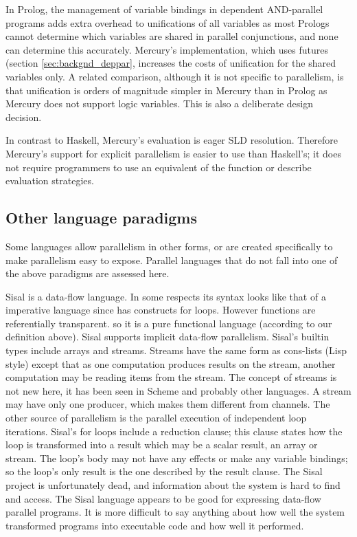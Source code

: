 In Prolog, the management of variable bindings in dependent AND-parallel
programs adds extra overhead to unifications of all variables
as most Prologs cannot determine which variables are shared in parallel
conjunctions,
and none can determine this accurately.
Mercury's implementation,
which uses futures (section \ref{sec:backgnd_deppar},
increases the costs of unification for the shared variables only.
A related comparison, although it is not specific to parallelism,
is that unification is orders of magnitude simpler in Mercury than in
Prolog as Mercury does not support logic variables.
This is also a deliberate design decision.

In contrast to Haskell,
Mercury's evaluation is eager SLD resolution.
Therefore Mercury's support for explicit parallelism is easier to use
than Haskell's;
it does not require programmers to use an equivalent of
the  function or describe evaluation strategies.



\subsection{Other language paradigms}
\label{sec:intro_par_other}

Some languages allow parallelism in other forms,
or are created specifically to make parallelism easy to expose.
Parallel languages that do not fall into one of the above paradigms are
assessed here.

Sisal \citep{feo:1990:sisal-report} is a data-flow language.
In some respects its syntax looks like that of a imperative language
since has constructs for loops.
However functions are referentially transparent.
so it is a pure functional language (according to our definition above).
Sisal supports implicit data-flow parallelism.
Sisal's builtin types include arrays and streams.
Streams have the same form as cons-lists (Lisp style) except that as one
computation produces results on the stream, another computation may be
reading items from the stream.
The concept of streams is not new here,
it has been seen in Scheme \citep{wizard-book} and probably other
languages.
A stream may have only one producer,
which makes them different from channels.
The other source of parallelism is the parallel execution of independent
loop iterations.
Sisal's for loops include a reduction clause;
this clause states how the loop is transformed into a result which may be a
scalar result, an array or stream.
The loop's body may not have any effects or make any variable bindings;
so the loop's only result is the one described by the result clause.
The Sisal project is unfortunately dead,
and information about the system is hard to find and access.
The Sisal language appears to be good for expressing data-flow
parallel programs.
It is more difficult to say anything about how well the system
transformed programs into executable code and how well it performed.

